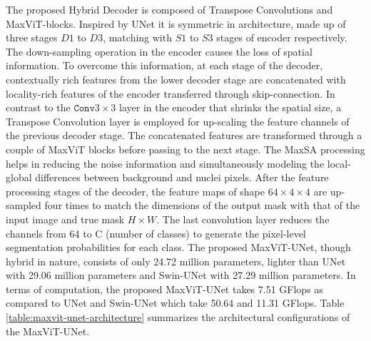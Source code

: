 \documentclass{article}
\begin{document}
The proposed Hybrid Decoder is composed of Transpose Convolutions and MaxViT-blocks. Inspired by UNet \cite{ronneberger2015u} it is symmetric in architecture, made up of three stages \(D1\) to \(D3\), matching with \(S1\) to \(S3\) stages of encoder respectively. The down-sampling operation in the encoder causes the loss of spatial information. To overcome this information, at each stage of the decoder, contextually rich features from the lower decoder stage are concatenated with locality-rich features of the encoder transferred through skip-connection. In contrast to the \(\texttt{Conv}3\times3\) layer in the encoder that shrinks the spatial size, a Transpose Convolution layer is employed for up-scaling the feature channels of the previous decoder stage. The concatenated features are transformed through a couple of MaxViT blocks before passing to the next stage. The MaxSA processing helps in reducing the noise information and simultaneously modeling the local-global differences between background and nuclei pixels. After the feature processing stages of the decoder, the feature maps of shape \(64 \times 4 \times 4\) are up-sampled four times to match the dimensions of the output mask with that of the input image and true mask \(H \times W\). The last convolution layer reduces the channels from 64 to C (number of classes) to generate the pixel-level segmentation probabilities for each class. The proposed MaxViT-UNet, though hybrid in nature, consists of only 24.72 million parameters, lighter than UNet with 29.06 million parameters and Swin-UNet with 27.29 million parameters. In terms of computation, the proposed MaxViT-UNet takes 7.51 GFlops as compared to UNet and Swin-UNet which take 50.64 and 11.31 GFlops. Table \ref{table:maxvit-unet-architecture} summarizes the architectural configurations of the MaxViT-UNet.
\end{document}
